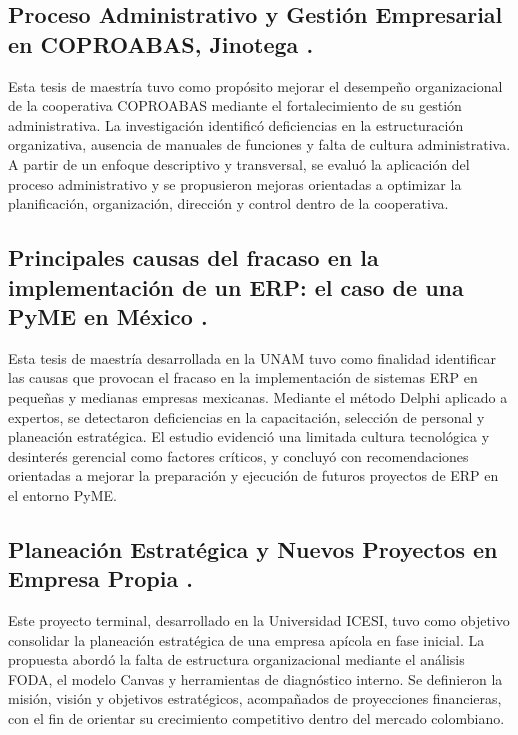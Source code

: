 \subsection{Proceso Administrativo y Gestión Empresarial en COPROABAS, Jinotega \cite{Flores15}.}

Esta tesis de maestría tuvo como propósito mejorar el desempeño organizacional de la cooperativa COPROABAS mediante el fortalecimiento de su gestión administrativa. La investigación identificó deficiencias en la estructuración organizativa, ausencia de manuales de funciones y falta de cultura administrativa. A partir de un enfoque descriptivo y transversal, se evaluó la aplicación del proceso administrativo y se propusieron mejoras orientadas a optimizar la planificación, organización, dirección y control dentro de la cooperativa.

\subsection{Principales causas del fracaso en la implementación de un ERP: el caso de una PyME en México \cite{Delgado2015}.}

Esta tesis de maestría desarrollada en la UNAM tuvo como finalidad identificar las causas que provocan el fracaso en la implementación de sistemas ERP en pequeñas y medianas empresas mexicanas. Mediante el método Delphi aplicado a expertos, se detectaron deficiencias en la capacitación, selección de personal y planeación estratégica. El estudio evidenció una limitada cultura tecnológica y desinterés gerencial como factores críticos, y concluyó con recomendaciones orientadas a mejorar la preparación y ejecución de futuros proyectos de ERP en el entorno PyME.

\subsection{Planeación Estratégica y Nuevos Proyectos en Empresa Propia \cite{Patino19}.}

Este proyecto terminal, desarrollado en la Universidad ICESI, tuvo como objetivo consolidar la planeación estratégica de una empresa apícola en fase inicial. La propuesta abordó la falta de estructura organizacional mediante el análisis FODA, el modelo Canvas y herramientas de diagnóstico interno. Se definieron la misión, visión y objetivos estratégicos, acompañados de proyecciones financieras, con el fin de orientar su crecimiento competitivo dentro del mercado colombiano.

